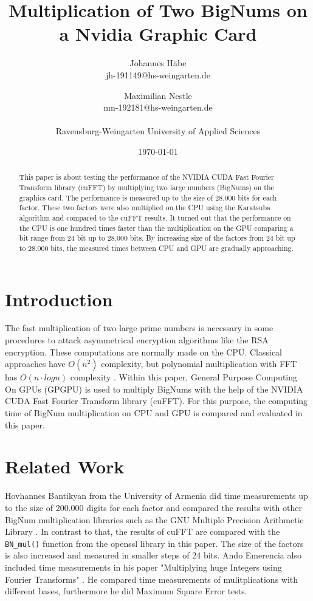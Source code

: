 \documentclass[12pt,a4paper]{article}
\title{Multiplication of Two BigNums on a Nvidia Graphic Card}
\author{Johannes H\"abe  \\
	jh-191149@hs-weingarten.de
	\and 
	Maximilian Nestle \\
	mn-192181@hs-weingarten.de \\\\
	Ravensburg-Weingarten University of Applied Sciences
	}
\date{\today}
\begin{document}
\maketitle
%
\begin{abstract}
This paper is about testing the performance of the NVIDIA CUDA Fast Fourier Transform library (cuFFT) by multiplying two large numbers (BigNums) on the graphics card. The performance is measured up to the size of 28.000 bits for each factor. These two factors were also multiplied on the CPU using the Karatsuba algorithm and compared to the cuFFT results. It turned out that the performance on the CPU is one hundred times faster than the multiplication on the GPU comparing a bit range from 24 bit up to 28.000 bits. By increasing size of the factors from 24 bit up to 28.000 bits, the measured times between CPU and GPU are gradually approaching.
\end{abstract}

\section{Introduction}
The fast multiplication of two large prime numbers is necessary in some procedures to attack asymmetrical encryption algorithms like the RSA encryption. These computations are normally made on the CPU. Classical approaches have $O(n^2)$ complexity, but polynomial multiplication with FFT has $O(n \cdot logn)$ complexity \cite{bantikyan2014big}. Within this paper, General Purpose Computing On GPUs (GPGPU) is used to multiply BigNums with the help of the NVIDIA CUDA Fast Fourier Transform library (cuFFT). For this purpose, the computing time of BigNum multiplication on CPU and GPU is compared and evaluated in this paper.

\section{Related Work}
Hovhannes Bantikyan from the University of Armenia did time measurements up to the size of 200.000 digits for each factor and compared the results with other BigNum multiplication libraries such as the GNU Multiple Precision Arithmetic Library \cite{bantikyan2014big}. In contrast to that, the results of cuFFT are compared with the \texttt{BN_mul()} function from the openssl library in this paper. The size of the factors is also increased and measured in smaller steps of 24 bits. Ando Emerencia also included time measurements in his paper "Multiplying huge Integers using Fourier Transforms" \cite{emerencia2007multiplying}. He compared time measurements of mulitplications with different bases, furthermore he did Maximum Square Error tests.
\end{document}
